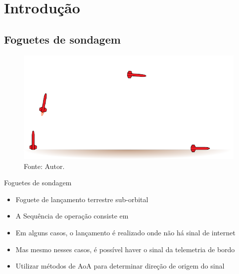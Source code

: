\section{Introdução}

\subsection{Foguetes de sondagem}

\begin{frame}
    \begin{figure}
        \centering
        \includegraphics[width=\textwidth]{../pictures/conops.pdf}
        \caption*{ \tiny Fonte: Autor.}
    \end{figure}
\end{frame}

\begin{frame}{Foguetes de sondagem}
    \begin{itemize}[<+->]\addtolength{\itemsep}{0.5\baselineskip}
        \item Foguete de lançamento terrestre sub-orbital
        \item A Sequência de operação consiste em 
        \item Em alguns casos, o lançamento é realizado onde não há sinal de internet
        \item Mas mesmo nesses casos, é possível haver o sinal da telemetria de bordo
        \item Utilizar métodos de AoA para determinar direção de origem do sinal
    \end{itemize}
\end{frame}

